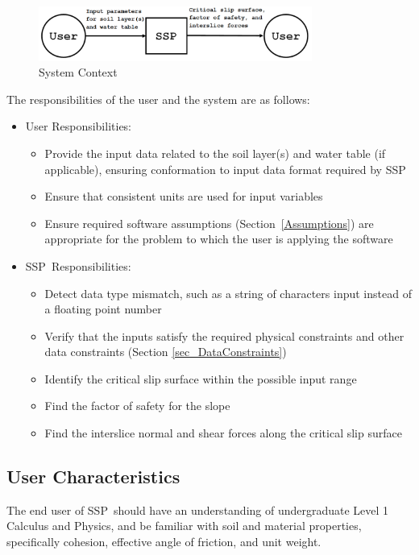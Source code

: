 \documentclass[12pt]{article}
\newcommand{\progname}{SSP}
\begin{document}
\begin{figure}[h!]
	\begin{center}
		\includegraphics[width=0.8\textwidth]{SystemContextFigure.png}
		\caption{System Context}
		\label{Fig_SystemContext}
	\end{center}
\end{figure}

\noindent The responsibilities of the user and the system are as follows:

\begin{itemize}
\item User Responsibilities:
  \begin{itemize}
  \item Provide the input data related to the soil layer(s) and water table (if 
  applicable), ensuring conformation to input data format required by \progname
  \item Ensure that consistent units are used for input variables
  \item Ensure required software assumptions (Section~\ref{Assumptions}) are
    appropriate for the problem to which the user is applying the software
  \end{itemize}
\item \progname\ Responsibilities:
  \begin{itemize}
  \item Detect data type mismatch, such as a string of characters input instead
    of a floating point number
  \item Verify that the inputs satisfy the required physical constraints and 
  other data constraints (Section \ref{sec_DataConstraints})
  \item Identify the critical slip surface within the possible input range
  \item Find the factor of safety for the slope
  \item Find the interslice normal and shear forces along the critical slip 
  surface
  \end{itemize}
\end{itemize}

\subsection{User Characteristics}
\label{Sec:UserChar}
The end user of \progname\ should have an understanding of undergraduate
Level 1 Calculus and Physics, and be familiar with soil and material
properties, specifically cohesion, effective angle of friction, and unit weight.
\end{document}
